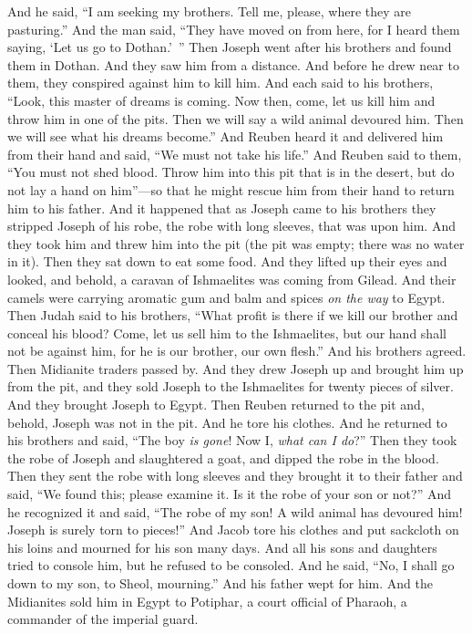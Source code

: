 \begin{biblechapter}
\verse And he said, “I am seeking my brothers. Tell me, please, where they are pasturing.”
\verse And the man said, “They have moved on from here, for I heard them saying, ‘Let us go to Dothan.’ ” Then Joseph went after his brothers and found them in Dothan.
\verse And they saw him from a distance. And before he drew near to them, they conspired against him to kill him.
\verse And each said to his brothers, “Look, this master of dreams is coming.
\verse Now then, come, let us kill him and throw him in one of the pits. Then we will say a wild animal devoured him. Then we will see what his dreams become.”
\verse And Reuben heard it and delivered him from their hand and said, “We must not take his life.”
\verse And Reuben said to them, “You must not shed blood. Throw him into this pit that is in the desert, but do not lay a hand on him”—so that he might rescue him from their hand to return him to his father.
\verse And it happened that as Joseph came to his brothers they stripped Joseph of his robe, the robe with long sleeves, that was upon him.
\verse And they took him and threw him into the pit (the pit was empty; there was no water in it).
\verse Then they sat down to eat some food. And they lifted up their eyes and looked, and behold, a caravan of Ishmaelites was coming from Gilead. And their camels were carrying aromatic gum and balm and spices \textit{on the way} to Egypt.
\verse Then Judah said to his brothers, “What profit is there if we kill our brother and conceal his blood?
\verse Come, let us sell him to the Ishmaelites, but our hand shall not be against him, for he is our brother, our own flesh.” And his brothers agreed.
\verse Then Midianite traders passed by. And they drew Joseph up and brought him up from the pit, and they sold Joseph to the Ishmaelites for twenty pieces of silver. And they brought Joseph to Egypt.
\verse Then Reuben returned to the pit and, behold, Joseph was not in the pit. And he tore his clothes.
\verse And he returned to his brothers and said, “The boy \textit{is gone}! Now I, \textit{what can I do}?”
\verse Then they took the robe of Joseph and slaughtered a goat, and dipped the robe in the blood.
\verse Then they sent the robe with long sleeves and they brought it to their father and said, “We found this; please examine it. Is it the robe of your son or not?”
\verse And he recognized it and said, “The robe of my son! A wild animal has devoured him! Joseph is surely torn to pieces!”
\verse And Jacob tore his clothes and put sackcloth on his loins and mourned for his son many days.
\verse And all his sons and daughters tried to console him, but he refused to be consoled. And he said, “No, I shall go down to my son, to Sheol, mourning.” And his father wept for him.
\verse And the Midianites sold him in Egypt to Potiphar, a court official of Pharaoh, a commander of the imperial guard.
\end{biblechapter}


